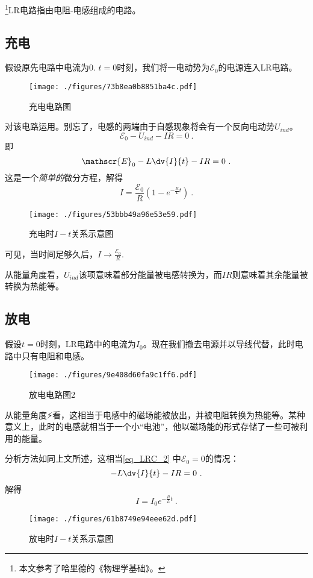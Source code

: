 

\footnote{本文参考了哈里德的《物理学基础》。}LR电路指由电阻-电感组成的电路。

\subsection{充电}
假设原先电路中电流为$0$. $t=0$时刻，我们将一电动势为$\mathscr{E}_0$的电源连入LR电路。
\begin{figure}[ht]
\centering
\texttt{[image: ./figures/73b8ea0b8851ba4c.pdf]}
\caption{充电电路图} \label{fig_LRC_1}
\end{figure}

对该电路运用。别忘了，电感的两端由于自感现象将会有一个反向电动势$U_{ind}$。
$$
\mathscr{E}_0 - U_{ind} - IR = 0~.
$$
即
\begin{equation}\label{eq_LRC_2}
\mathscr{E}_0 - L\dv{I}{t} - IR = 0~.
\end{equation}
这是一个\textsl{简单的}微分方程，解得
\begin{equation}\label{eq_LRC_1}
I = \frac{\mathscr{E}_0}{R} (1-e^{-\frac{R}{L}t})~.
\end{equation}

\begin{figure}[ht]
\centering
\texttt{[image: ./figures/53bbb49a96e53e59.pdf]}
\caption{充电时$I-t$关系示意图} \label{fig_LRC_3}
\end{figure}
可见，当时间足够久后，$I\to\frac{\mathscr{E_0}}{R}$.

从能量角度看，$U_{ind}$该项意味着部分能量被电感转换为，而$IR$则意味着其余能量被转换为热能等。

\subsection{放电}
假设$t=0$时刻，LR电路中的电流为$I_0$。现在我们撤去电源并以导线代替，此时电路中只有电阻和电感。
\begin{figure}[ht]
\centering
\texttt{[image: ./figures/9e408d60fa9c1ff6.pdf]}
\caption{放电电路图2} \label{fig_LRC_2}
\end{figure}
从能量角度⚡️看，这相当于电感中的磁场能被放出，并被电阻转换为热能等。某种意义上，此时的电感就相当于一个小“电池”，他以磁场能的形式存储了一些可被利用的能量。

分析方法如同上文所述，这相当\autoref{eq_LRC_2}  中$\mathscr{E}_0=0$的情况：
\begin{equation}
- L\dv{I}{t} - IR = 0~.
\end{equation}
解得
\begin{equation}
I = I_0 e^{-\frac{R}{L}t}~.
\end{equation}
\begin{figure}[ht]
\centering
\texttt{[image: ./figures/61b8749e94eee62d.pdf]}
\caption{放电时$I-t$关系示意图} \label{fig_LRC_4}
\end{figure}
